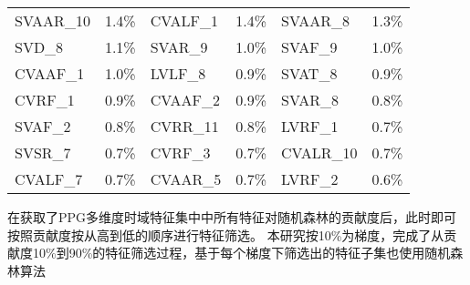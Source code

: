 \begin{center}
\begin{longtable}{m{1.5cm}<{\centering}m{2cm}<{\centering}m{2cm}<{\centering}m{2cm}<{\centering}m{2cm}<{\centering}m{2cm}<{\centering}}
            \cellcolor{pink}SVAAR\_10                        & \cellcolor{pink}1.4\%                            & \cellcolor{cyan}CVALF\_1                         & \cellcolor{cyan}1.4\%                            & \cellcolor{pink}SVAAR\_8                         & \cellcolor{pink}1.3\%                            \\
            SVD\_8                                           & 1.1\%                                            & \cellcolor{pink}SVAR\_9                          & \cellcolor{pink}1.0\%                            & \cellcolor{cyan}SVAF\_9                          & \cellcolor{cyan}1.0\%                            \\
            \cellcolor{cyan}CVAAF\_1                         & \cellcolor{cyan}1.0\%                            & \cellcolor{cyan}LVLF\_8                          & \cellcolor{cyan}0.9\%                            & SVAT\_8                          & 0.9\%                            \\
            \cellcolor{cyan}CVRF\_1                          & \cellcolor{cyan}0.9\%                            & \cellcolor{cyan}CVAAF\_2                         & \cellcolor{cyan}0.9\%                            & \cellcolor{pink}SVAR\_8                          & \cellcolor{pink}0.8\%                            \\
            \cellcolor{cyan}SVAF\_2                          & \cellcolor{cyan}0.8\%                            & \cellcolor{pink}CVRR\_11                         & \cellcolor{pink}0.8\%                            & \cellcolor{cyan}LVRF\_1                          & \cellcolor{cyan}0.7\%                            \\
            \cellcolor{pink}SVSR\_7                          & \cellcolor{pink}0.7\%                            & \cellcolor{cyan}CVRF\_3                          & \cellcolor{cyan}0.7\%                            & \cellcolor{pink}CVALR\_10                        & \cellcolor{pink}0.7\%                            \\
            \cellcolor{cyan}CVALF\_7                         & \cellcolor{cyan}0.7\%                            & \cellcolor{pink}CVAAR\_5                         & \cellcolor{pink}0.7\%                            & \cellcolor{cyan}LVRF\_2                          & \cellcolor{cyan}0.6\%                           
      \end{longtable}
\end{center}

在获取了PPG多维度时域特征集中中所有特征对随机森林的贡献度后，此时即可按照贡献度按从高到低的顺序进行特征筛选。
本研究按10\%为梯度，完成了从贡献度10\%到90\%的特征筛选过程，基于每个梯度下筛选出的特征子集也使用随机森林算法

